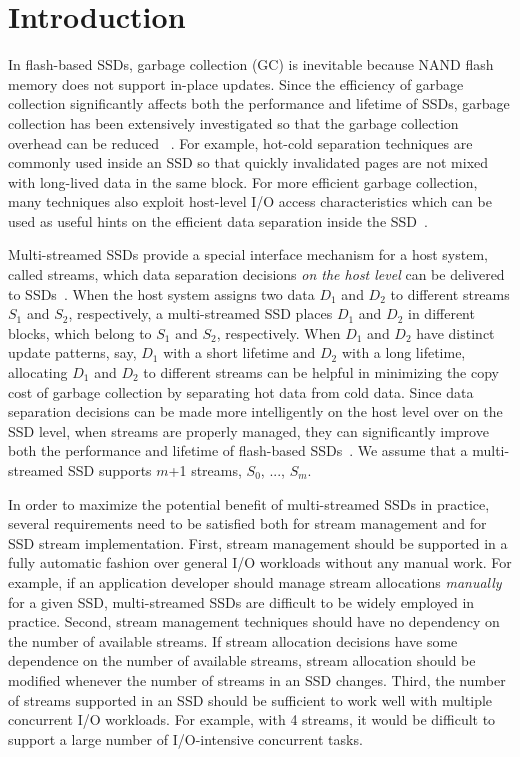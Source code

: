 \vspace{-12pt}
\section{Introduction}
\label{sec:intro}
\vspace{-4pt}
In flash-based SSDs, garbage collection (GC) is inevitable because NAND flash
memory does not support in-place updates.  Since the efficiency of garbage
collection significantly affects  both the performance and lifetime of SSDs,
garbage collection has been extensively investigated so that the garbage
collection overhead can be reduced ~\cite{DAC, WriteAmplification, GCGreedy,
GCVictim, GCTTFlash, HotCold}.  For example, hot-cold separation techniques are
commonly used inside an SSD so that quickly invalidated pages are not mixed
with long-lived data in the same block.   For more efficient garbage
collection, many techniques also exploit host-level I/O access characteristics
which can be used as useful hints on the efficient data separation inside the
SSD~\cite{JiTGC, ShadowGC}.

Multi-streamed SSDs provide a special interface mechanism for a host system,
called streams, which data separation decisions {\it on the
host level} can be delivered to SSDs~\cite{T10, MultiStream}.  When the host
system assigns two data $D_1$ and $D_2$ to different streams $S_1$ and $S_2$,
respectively, a multi-streamed SSD places $D_1$ and $D_2$ in different blocks,
which belong to $S_1$ and $S_2$, respectively.  When $D_1$ and $D_2$ have
distinct update patterns, say, $D_1$ with a short lifetime and $D_2$ with a
long lifetime, allocating $D_1$ and $D_2$ to different streams can be helpful
in minimizing the copy cost of garbage collection by separating hot data from
cold data.  Since data separation decisions can be made more intelligently on
the host level over on the SSD level, when streams are properly managed, they
can significantly improve both the performance and lifetime of flash-based
SSDs~\cite{MultiStream, Level,vStream, FStream, AutoStream}.  We assume that a
multi-streamed SSD supports $m$+1 streams, $S_0$, ..., $S_{m}$.

In order to maximize the potential benefit of multi-streamed SSDs in practice,
several requirements need to be satisfied both for stream management and for
SSD stream implementation.  First, stream management should be supported in a
fully automatic fashion over general I/O workloads without any manual work.
For example, if an application developer should manage stream allocations {\it
manually} for a given SSD, multi-streamed SSDs are difficult to be widely
employed in practice.   Second, stream management techniques should have no
dependency on the number of available streams.  If stream allocation decisions
have some dependence on the number of available streams,  stream allocation
should be modified whenever the number of streams in an SSD changes.  Third,
the number of streams supported in an SSD should be sufficient to work well
with multiple concurrent I/O workloads.  For example, with 4 streams, it would
be difficult to support a large number of I/O-intensive concurrent tasks.  

